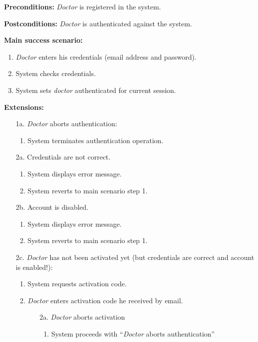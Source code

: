 \documentclass[fontsize=12pt,
               paper=a4,
               twoside=false,
               parskip=half,
               ]{scrartcl}
\begin{document}
\textbf{\textsf{Preconditions:}} \emph{Doctor} is registered in the system.

\textbf{\textsf{Postconditions:}} \emph{Doctor} is authenticated against the system.

\textbf{\textsf{Main success scenario:}}

\begin{enumerate}[leftmargin=3em]
	\item \emph{Doctor} enters his credentials (email address and password).
	\item System checks credentials.
	\item System sets \emph{doctor} authenticated for current session.
\end{enumerate}

\textbf{\textsf{Extensions:}}

\begin{itemize}[leftmargin=3em]
	\item[1a.] \emph{Doctor} aborts authentication:
	\begin{enumerate}
		\item System terminates authentication operation.
	\end{enumerate}
	\item[2a.] Credentials are not correct.
	\begin{enumerate}
		\item System displays error message.
		\item System reverts to main scenario step 1.
	\end{enumerate}
	\item[2b.] Account is disabled.
	\begin{enumerate}
		\item System displays error message.
		\item System reverts to main scenario step 1.
	\end{enumerate}
	\item[2c.] \emph{Doctor} has not been activated yet (but credentials are correct and account is enabled!):
	\begin{enumerate}
		\item System requests activation code.
		\item \emph{Doctor} enters activation code he received by email.
		\begin{itemize}
			\item[2a.] \emph{Doctor} aborts activation
			\begin{enumerate}[label=\arabic*.]
				\item System proceeds with \enquote{\emph{Doctor} aborts authentication}

\end{enumerate}
\end{itemize}
\end{enumerate}
\end{itemize}
\end{document}
